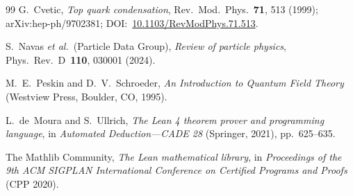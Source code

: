 \documentclass[aps,prd,twocolumn,showpacs,superscriptaddress,nofootinbib]{revtex4-2}
\begin{document}
\begin{thebibliography}{99}
G.~Cvetic,
\emph{Top quark condensation},
Rev.~Mod.~Phys.~\textbf{71}, 513 (1999); arXiv:hep-ph/9702381; DOI:~\href{https://doi.org/10.1103/RevModPhys.71.513}{10.1103/RevModPhys.71.513}.

S.~Navas \textit{et al.}~(Particle Data Group),
\emph{Review of particle physics},
Phys.~Rev.~D~\textbf{110}, 030001 (2024).

M.~E.~Peskin and D.~V.~Schroeder,
\emph{An Introduction to Quantum Field Theory}
(Westview Press, Boulder, CO, 1995).

L.~de~Moura and S.~Ullrich,
\emph{The Lean 4 theorem prover and programming language},
in \emph{Automated Deduction---CADE 28} (Springer, 2021), pp.~625--635.

The Mathlib Community,
\emph{The Lean mathematical library},
in \emph{Proceedings of the 9th ACM SIGPLAN International Conference on Certified Programs and Proofs} (CPP 2020).

\end{thebibliography}
\end{document}
